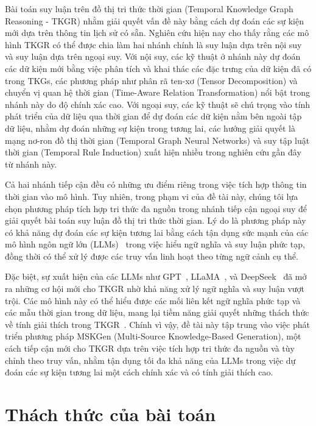 Bài toán suy luận trên đồ thị tri thức thời gian (Temporal Knowledge Graph Reasoning - TKGR) nhằm giải quyết vấn đề này bằng cách dự đoán các sự kiện mới dựa trên thông tin lịch sử có sẵn. Nghiên cứu hiện nay cho thấy rằng các mô hình TKGR có thể được chia làm hai nhánh chính là suy luận dựa trên nội suy và suy luận dựa trên ngoại suy. Với nội suy, các kỹ thuật ở nhánh này dự đoán các dữ kiện mới bằng việc phân tích và khai thác các đặc trưng của dữ kiện đã có trong TKGs, các phương pháp như phân rã ten-xơ (Tensor Decomposition) và chuyển vị quan hệ thời gian (Time-Aware Relation Transformation) nổi bật trong nhánh này do độ chính xác cao. Với ngoại suy, các kỹ thuật sẽ chú trọng vào tính phát triển của dữ liệu qua thời gian để dự đoán các dữ kiện nằm bên ngoài tập dữ liệu, nhằm dự đoán những sự kiện trong tương lai, các hướng giải quyết là mạng nơ-ron đồ thị thời gian (Temporal Graph Neural Networks) và suy tập luật thời gian (Temporal Rule Induction) xuất hiện nhiều trong nghiên cứu gần đây từ nhánh này.

Cả hai nhánh tiếp cận đều có những ưu điểm riêng trong việc tích hợp thông tin thời gian vào mô hình. Tuy nhiên, trong phạm vi của đề tài này, chúng tôi lựa chọn phương pháp tích hợp tri thức đa nguồn trong nhánh tiếp cận ngoại suy để giải quyết bài toán suy luận đồ thị tri thức thời gian. Lý do là phương pháp này có khả năng dự đoán các sự kiện tương lai bằng cách tận dụng sức mạnh của các mô hình ngôn ngữ lớn (LLMs)~\cite{ref_article04} trong việc hiểu ngữ nghĩa và suy luận phức tạp, đồng thời có thể xử lý được các truy vấn linh hoạt theo từng ngữ cảnh cụ thể.

Đặc biệt, sự xuất hiện của các LLMs như GPT~\cite{ref_article05}, LLaMA~\cite{ref_article06}, và DeepSeek~\cite{ref_article07} đã mở ra những cơ hội mới cho TKGR nhờ khả năng xử lý ngữ nghĩa và suy luận vượt trội. Các mô hình này có thể hiểu được các mối liên kết ngữ nghĩa phức tạp và các mẫu thời gian trong dữ liệu, mang lại tiềm năng giải quyết những thách thức về tính giải thích trong TKGR~\cite{ref_article03}. Chính vì vậy, đề tài này tập trung vào việc phát triển phương pháp MSKGen (Multi-Source Knowledge-Based Generation), một cách tiếp cận mới cho TKGR dựa trên việc tích hợp tri thức đa nguồn và tùy chỉnh theo truy vấn, nhằm tận dụng tối đa khả năng của LLMs trong việc dự đoán các sự kiện tương lai một cách chính xác và có tính giải thích cao.


\section{Thách thức của bài toán}

